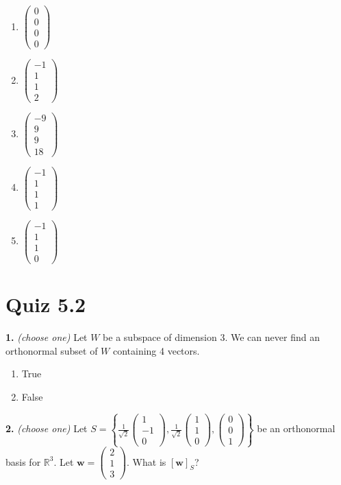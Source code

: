 \documentclass[10pt,a4paper]{article}
\begin{document}
\begin{enumerate}[label=(\Alph*)]
\item \(\begin{pmatrix}0\\0\\0\\0\end{pmatrix}\)
\item \(\begin{pmatrix}-1\\1\\1\\2\end{pmatrix}\)
\item \(\begin{pmatrix}-9\\9\\9\\18\end{pmatrix}\)
\item \(\begin{pmatrix}-1\\1\\1\\1\end{pmatrix}\)
\item \(\begin{pmatrix}-1\\1\\1\\0\end{pmatrix}\)
\end{enumerate}
\smallskip
\section{Quiz 5.2}
\textbf{1.} \textit{(choose one)} Let \(W\) be a subspace of dimension 3. We can never find an orthonormal subset of \(W\) containing 4 vectors.

\begin{enumerate}[label=(\Alph*)]
\item True
\item False
\end{enumerate}
\smallskip
\textbf{2.} \textit{(choose one)} Let \(S=\left\{\frac{1}{\sqrt{2}}\begin{pmatrix}1\\-1\\0\end{pmatrix},\frac{1}{\sqrt{2}}\begin{pmatrix}1\\1\\0\end{pmatrix},\begin{pmatrix}0\\0\\1\end{pmatrix}\right\}\) be an orthonormal basis for \(\mathbb{R}^3\). Let \(\mathbf{w}=\begin{pmatrix}2\\1\\3\end{pmatrix}\). What is \([\mathbf{w}]_S\)?
\end{document}
